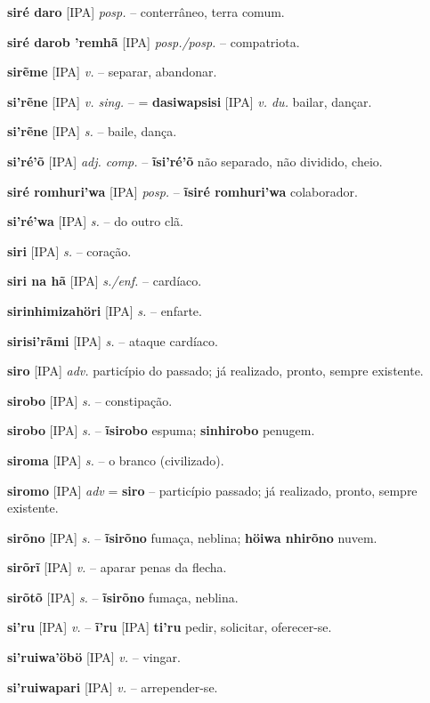 \textbf{siré daro} [IPA] \textit{posp.} -- conterrâneo, terra comum.

\textbf{siré darob 'remhã} [IPA] \textit{posp./posp.} -- compatriota.

\textbf{sirẽme} [IPA] \textit{v.} -- separar, abandonar.

\textbf{si'rẽne} [IPA] \textit{v. sing.} -- = \textbf{dasiwapsisi} [IPA] \textit{v. du.} bailar, dançar.

\textbf{si'rẽne} [IPA] \textit{s.} -- baile, dança.

\textbf{si'ré'õ} [IPA] \textit{adj. comp.} -- \textbf{ĩsi'ré'õ} não separado, não dividido, cheio.

\textbf{siré romhuri'wa} [IPA] \textit{posp.} -- \textbf{ĩsiré romhuri'wa} colaborador.

\textbf{si'ré'wa} [IPA] \textit{s.} -- do outro clã.

\textbf{siri} [IPA] \textit{s.} -- coração.

\textbf{siri na hã} [IPA] \textit{s./enf.} -- cardíaco.

\textbf{sirinhimizahöri} [IPA] \textit{s.} -- enfarte.

\textbf{sirisi'rãmi} [IPA] \textit{s.} -- ataque cardíaco.

\textbf{siro} [IPA] \textit{adv.} particípio do passado; já realizado, pronto, sempre existente.

\textbf{sirobo} [IPA] \textit{s.} -- constipação.

\textbf{sirobo} [IPA] \textit{s.} -- \textbf{ĩsirobo} espuma; \textbf{sinhirobo} penugem.

\textbf{siroma} [IPA] \textit{s.} -- o branco (civilizado).

\textbf{siromo} [IPA] \textit{adv} = \textbf{siro} -- particípio passado; já realizado, pronto, sempre existente.

\textbf{sirõno} [IPA] \textit{s.} -- \textbf{ĩsirõno} fumaça, neblina; \textbf{höiwa nhirõno} nuvem.

\textbf{sirõrĩ} [IPA] \textit{v.} -- aparar penas da flecha.

\textbf{sirõtõ} [IPA] \textit{s.} -- \textbf{ĩsirõno} fumaça, neblina.

\textbf{si'ru} [IPA] \textit{v.} -- \textbf{ĩ'ru} [IPA] \textbf{ti'ru} pedir, solicitar, oferecer-se.

\textbf{si'ruiwa'öbö} [IPA] \textit{v.} -- vingar.

\textbf{si'ruiwapari} [IPA] \textit{v.} -- arrepender-se.

